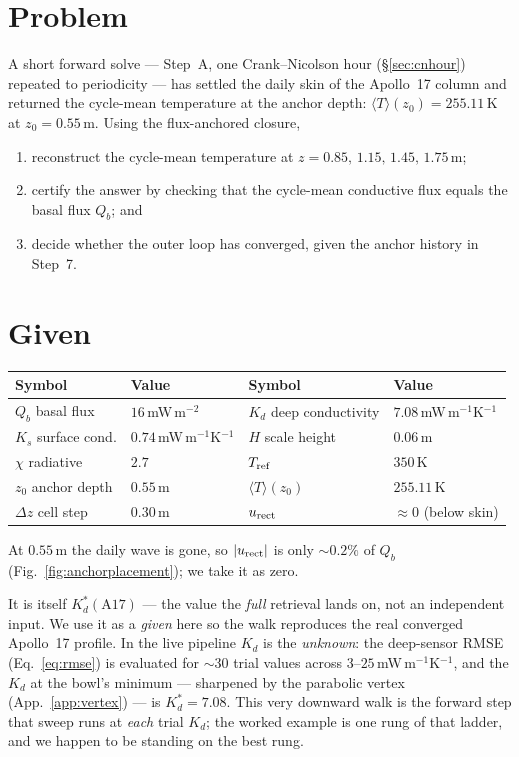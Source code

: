 \documentclass[11pt]{report}
\newcommand{\Tm}{\langle T\rangle}
\begin{document}
\section{Problem}
A short forward solve --- Step~A, one Crank--Nicolson hour (\S\ref{sec:cnhour})
repeated to periodicity --- has settled the daily skin of the Apollo~17 column and
returned the cycle-mean temperature at the anchor depth: $\Tm(z_0)=255.11$\,K at
$z_0=0.55$\,m. Using the flux-anchored closure,
\begin{enumerate}[label=\textbf{(\alph*)},leftmargin=2.2em,itemsep=1pt]
\item reconstruct the cycle-mean temperature at $z=0.85,\,1.15,\,1.45,\,1.75$\,m;
\item certify the answer by checking that the cycle-mean conductive flux equals the
  basal flux $Q_b$; and
\item decide whether the outer loop has converged, given the anchor history in
  Step~7.
\end{enumerate}

\section{Given}
\begin{center}\small
\begin{tabular}{@{}llll@{}}
\toprule
Symbol & Value & Symbol & Value \\
\midrule
$Q_b$ basal flux     & $16$\,mW\,m$^{-2}$ & $K_d$ deep conductivity & $7.08$\,mW\,m$^{-1}$K$^{-1}$ \\
$K_s$ surface cond.  & $0.74$\,mW\,m$^{-1}$K$^{-1}$ & $H$ scale height & $0.06$\,m \\
$\chi$ radiative     & $2.7$              & $T_{\rm ref}$           & $350$\,K \\
$z_0$ anchor depth   & $0.55$\,m          & $\Tm(z_0)$              & $255.11$\,K \\
$\Delta z$ cell step & $0.30$\,m          & $u_{\rm rect}$          & $\approx 0$ (below skin) \\
\bottomrule
\end{tabular}
\end{center}
\noindent At $0.55$\,m the daily wave is gone, so $|u_{\rm rect}|$ is only ${\sim}0.2\%$ of
$Q_b$ (Fig.~\ref{fig:anchorplacement}); we take it as zero.

\begin{plain}[title={Where does $K_d=7.08$ come from?}]
It is itself $K_d^{*}(\mathrm{A17})$ --- the value the \emph{full} retrieval lands on,
not an independent input. We use it as a \emph{given} here so the walk reproduces the
real converged Apollo~17 profile. In the live pipeline $K_d$ is the \emph{unknown}: the
deep-sensor RMSE (Eq.~\ref{eq:rmse}) is evaluated for ${\sim}30$ trial values across
$3$--$25$\,mW\,m$^{-1}$K$^{-1}$, and the $K_d$ at the bowl's minimum --- sharpened by
the parabolic vertex (App.~\ref{app:vertex}) --- is $K_d^{*}=7.08$. This very downward
walk is the forward step that sweep runs at \emph{each} trial $K_d$; the worked example
is one rung of that ladder, and we happen to be standing on the best rung.
\end{plain}
\end{document}
